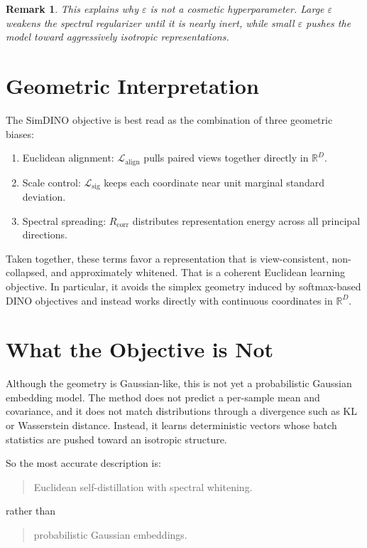 \documentclass[11pt]{article}
\newtheorem*{remark}{Remark}
\newcommand{\R}{\mathbb{R}}
\begin{document}
\begin{remark}
This explains why $\varepsilon$ is not a cosmetic hyperparameter. Large $\varepsilon$ weakens the spectral regularizer until it is nearly inert, while small $\varepsilon$ pushes the model toward aggressively isotropic representations.
\end{remark}

\section{Geometric Interpretation}

The SimDINO objective is best read as the combination of three geometric biases:
\begin{enumerate}
    \item Euclidean alignment: $\mathcal{L}_{\mathrm{align}}$ pulls paired views together directly in $\R^D$.
    \item Scale control: $\mathcal{L}_{\mathrm{sig}}$ keeps each coordinate near unit marginal standard deviation.
    \item Spectral spreading: $R_{\mathrm{corr}}$ distributes representation energy across all principal directions.
\end{enumerate}

Taken together, these terms favor a representation that is view-consistent, non-collapsed, and approximately whitened. That is a coherent Euclidean learning objective. In particular, it avoids the simplex geometry induced by softmax-based DINO objectives and instead works directly with continuous coordinates in $\R^D$.

\section{What the Objective is Not}

Although the geometry is Gaussian-like, this is not yet a probabilistic Gaussian embedding model. The method does not predict a per-sample mean and covariance, and it does not match distributions through a divergence such as KL or Wasserstein distance. Instead, it learns deterministic vectors whose batch statistics are pushed toward an isotropic structure.

So the most accurate description is:
\begin{quote}
Euclidean self-distillation with spectral whitening.
\end{quote}
rather than
\begin{quote}
probabilistic Gaussian embeddings.
\end{quote}
\end{document}
